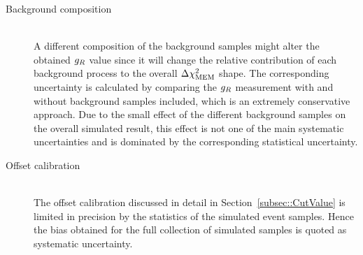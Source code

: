 \begin{myindentpar}
\begin{description}
    \item[Background composition] \hfill \\
    A different composition of the background samples might alter the obtained $g_{R}$ value since it will change the relative contribution of each background process to the overall $\Delta \chi^{2}_{\textrm{MEM}}$ shape.
    The corresponding uncertainty is calculated by comparing the $g_{R}$ measurement with and without background samples included, which is an extremely conservative approach.
    Due to the small effect of the different background samples on the overall simulated result, this effect is not one of the main systematic uncertainties and is dominated by the corresponding statistical uncertainty.

    \item[Offset calibration] \hfill \\
    The offset calibration discussed in detail in Section~\ref{subsec::CutValue} is limited in precision by the statistics of the simulated event samples. Hence the bias obtained for the full collection of simulated samples is quoted as systematic uncertainty.
    

\end{description}
\end{myindentpar}
